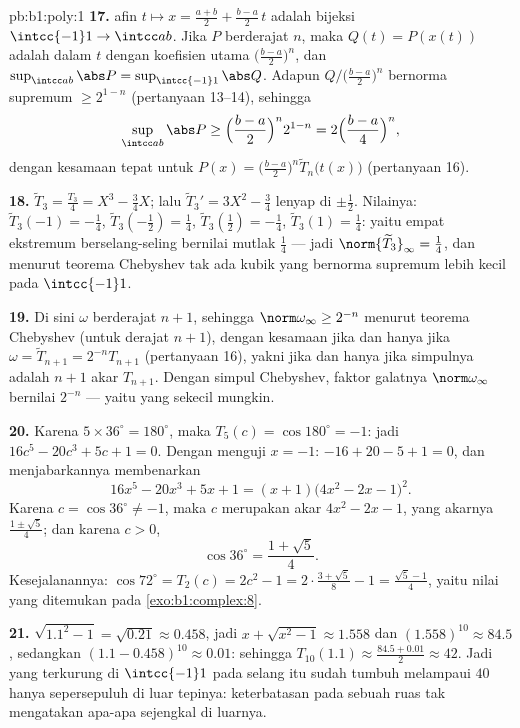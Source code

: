 \begin{solution}{pb:b1:poly:1}
\textbf{17.}  afin $t \mapsto x = \frac{a+b}2 +
\frac{b-a}2\,t$ adalah bijeksi $\intcc{-1}1 \to \intcc ab$. Jika $P$
 berderajat $n$, maka $Q(t) = P(x(t))$ adalah  dalam
$t$ dengan koefisien utama $\bigl(\frac{b-a}2\bigr)^n$, dan
$\sup_{\intcc ab}\abs P = \sup_{\intcc{-1}1}\abs Q$. Adapun  $Q/\bigl(\frac{b-a}2\bigr)^n$ bernorma supremum $\geq
2^{1-n}$ (pertanyaan 13--14), sehingga
\[
\sup_{\intcc ab}\abs P \geq \Bigl(\frac{b-a}2\Bigr)^n 2^{1-n}
= 2\Bigl(\frac{b-a}4\Bigr)^n ,
\]
dengan kesamaan tepat untuk $P(x) = \bigl(\frac{b-a}2\bigr)^n
\widetilde T_n\bigl(t(x)\bigr)$ (pertanyaan 16).

\textbf{18.} $\widetilde T_3 = \frac{T_3}4 = X^3 - \frac34X$;
lalu $\widetilde T_3{}' = 3X^2 - \frac34$ lenyap di $\pm\frac12$.
Nilainya: $\widetilde T_3(-1) = -\frac14$, $\widetilde
T_3(-\tfrac12) = \frac14$, $\widetilde T_3(\tfrac12) = -\frac14$,
$\widetilde T_3(1) = \frac14$: yaitu empat ekstremum berselang-seling
bernilai mutlak $\frac14$ --- jadi $\norm{\widetilde T_3}_\infty =
\frac14$, dan menurut teorema Chebyshev tak ada kubik  yang bernorma
supremum lebih kecil pada $\intcc{-1}1$.

\textbf{19.} Di sini $\omega$  berderajat $n + 1$, sehingga
$\norm\omega_\infty \geq 2^{-n}$ menurut teorema Chebyshev (untuk derajat
$n+1$), dengan kesamaan jika dan hanya jika $\omega = \widetilde T_{n+1}
= 2^{-n}T_{n+1}$ (pertanyaan 16), yakni jika dan hanya jika simpulnya
adalah $n + 1$ akar $T_{n+1}$. Dengan simpul Chebyshev, faktor galatnya
$\norm\omega_\infty$ bernilai $2^{-n}$ --- yaitu yang sekecil mungkin.

\textbf{20.} Karena $5 \times 36^\circ = 180^\circ$, maka $T_5(c) =
\cos180^\circ = -1$: jadi $16c^5 - 20c^3 + 5c + 1 = 0$. Dengan menguji $x =
-1$: $-16 + 20 - 5 + 1 = 0$, dan menjabarkannya membenarkan
\[
16x^5 - 20x^3 + 5x + 1 = (x + 1)\bigl(4x^2 - 2x - 1\bigr)^2 .
\]
Karena $c = \cos36^\circ \neq -1$, maka $c$ merupakan akar $4x^2 - 2x -
1$, yang akarnya $\frac{1 \pm \sqrt5}4$; dan karena $c > 0$,
\[
\cos36^\circ = \frac{1 + \sqrt5}4 .
\]
Kesejalanannya: $\cos72^\circ = T_2(c) = 2c^2 - 1 = 2\cdot\frac{3 +
\sqrt5}8 - 1 = \frac{\sqrt5 - 1}4$, yaitu nilai yang ditemukan pada
\cref{exo:b1:complex:8}.

\textbf{21.} $\sqrt{1.1^2 - 1} = \sqrt{0.21} \approx 0.458$, jadi
$x + \sqrt{x^2-1} \approx 1.558$ dan $(1.558)^{10} \approx 84.5$,
sedangkan $(1.1 - 0.458)^{10} \approx 0.01$: sehingga $T_{10}(1.1) \approx
\frac{84.5 + 0.01}2 \approx 42$. Jadi  yang terkurung di
$\intcc{-1}1$ pada selang itu sudah tumbuh melampaui $40$ hanya
sepersepuluh di luar tepinya: keterbatasan pada sebuah ruas tak mengatakan apa-apa
sejengkal di luarnya.


\end{solution}
